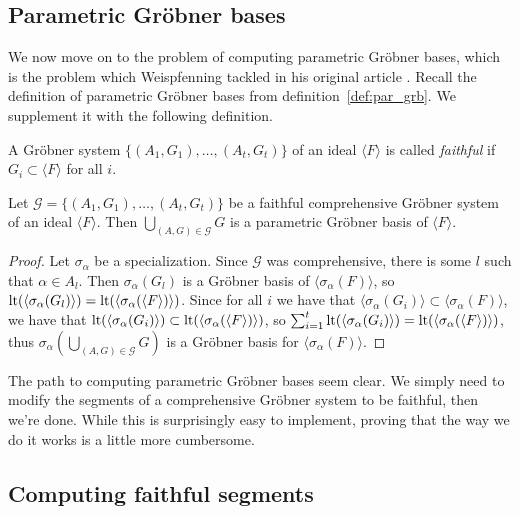 \subsection{Parametric Gröbner bases}
We now move on to the problem of computing parametric Gröbner bases, which is the problem which Weispfenning tackled in his original article \cite{Weispfenning}. Recall the definition of parametric Gröbner bases from definition~\ref{def:par_grb}. We supplement it with the following definition.

\begin{definition}
  A Gröbner system $\{(A_{1}, G_{1}), \dots, (A_{t}, G_{t})\}$ of an ideal $\langle F \rangle$ is called \textit{faithful} if $G_{i} \subset \langle F \rangle$ for all $i$.
\end{definition}

\begin{corollary}\label{cor:faithful_cgs_to_cgb}
  Let $\mathcal G = \{(A_{1}, G_{1}), \dots, (A_{t}, G_{t})\}$ be a faithful comprehensive Gröbner system of an ideal $\langle F \rangle$. Then $\bigcup_{(A, G) \in \mathcal G} G$ is a parametric Gröbner basis of $\langle F \rangle$.
\end{corollary}
\begin{proof}
  Let $\sigma_{\alpha}$ be a specialization. Since $\mathcal G$ was comprehensive, there is some $l$ such that $\alpha \in A_{l}$. Then $\sigma_{\alpha}(G_{l})$ is a Gröbner basis of $\langle \sigma_{\alpha}(F) \rangle$, so $\operatorname{lt}( \langle \sigma_{\alpha}(G_{l}) \rangle) = \operatorname{lt}( \langle \sigma_{\alpha}(\langle F \rangle) \rangle)$. Since for all $i$ we have that $\langle \sigma_{\alpha}(G_{i}) \rangle \subset \langle \sigma_{\alpha}(F) \rangle$, we have that $\operatorname{lt}( \langle \sigma_{\alpha}(G_{i}) \rangle ) \subset \operatorname{lt}( \langle \sigma_{\alpha}(\langle F \rangle) \rangle)$, so $\sum_{i=1}^{t} \operatorname{lt}( \langle \sigma_{\alpha}(G_{i}) \rangle) = \operatorname{lt}(\langle \sigma_{\alpha}(\langle F \rangle) \rangle )$, thus $\sigma_{\alpha}\left(\bigcup_{(A, G) \in \mathcal G} G\right)$ is a Gröbner basis for $\langle \sigma_{\alpha}(F) \rangle$.
\end{proof}

The path to computing parametric Gröbner bases seem clear. We simply need to modify the segments of a comprehensive Gröbner system to be faithful, then we're done. While this is surprisingly easy to implement, proving that the way we do it works is a little more cumbersome.

\subsection{Computing faithful segments}

